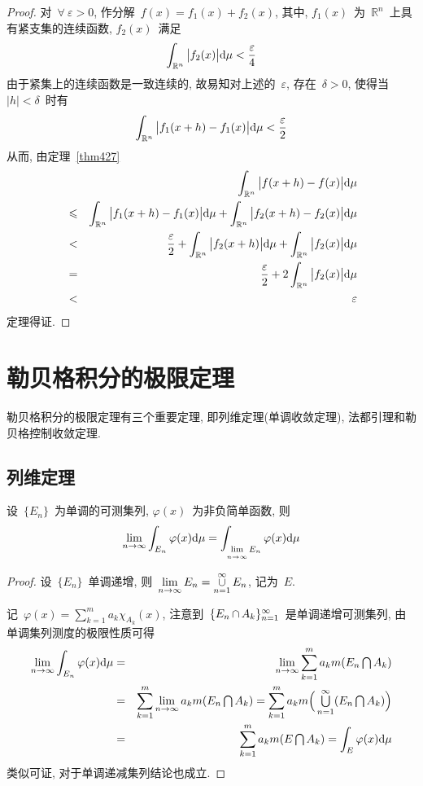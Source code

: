 \begin{proof}
对~$\forall~ \varepsilon > 0$, 作分解~$f(x) = f_1(x) + f_2(x)$, 其中, $f_1(x)$~为~$\mathbb{R}^n$~上具有紧支集的连续函数, $f_2(x)$~满足
\[
\int_{\mathbb{R}^n} \big|f_2(x)\big| \mathrm{d} \mu < \frac{\varepsilon}{4}
\]
由于紧集上的连续函数是一致连续的, 故易知对上述的~$\varepsilon$, 存在~$\delta > 0$, 使得当~$|h| < \delta$~时有
\[
\int_{\mathbb{R}^n} \big|f_1(x + h) - f_1(x) \big| \mathrm{d} \mu < \frac{\varepsilon}{2}
\]
从而, 由定理~\ref{thm427}
\begin{eqnarray*}
&& \int_{\mathbb{R}^n} \big| f(x + h) - f(x) \big| \mathrm{d} \mu \\
&\leqslant& \int_{\mathbb{R}^n} \big| f_1(x + h) - f_1(x) \big| \mathrm{d} \mu + \int_{\mathbb{R}^n} \big| f_2(x + h) - f_2(x) \big| \mathrm{d} \mu \\
&<& \frac{\varepsilon}{2} + \int_{\mathbb{R}^n} \big| f_2(x + h) \big| \mathrm{d} \mu + \int_{\mathbb{R}^n} \big| f_2(x) \big| \mathrm{d} \mu \\
&=& \frac{\varepsilon}{2} + 2 \int_{\mathbb{R}^n} \big| f_2(x) \big| \mathrm{d} \mu \\
&<& \varepsilon
\end{eqnarray*}
定理得证.
\end{proof}

\section{勒贝格积分的极限定理}

勒贝格积分的极限定理有三个重要定理, 即列维定理(单调收敛定理), 法都引理和勒贝格控制收敛定理.

\subsection{列维定理}

\begin{lemma} \label{lem431}
设~$\{E_n\}$~为单调的可测集列, $\varphi(x)$~为非负简单函数, 则
\[
\lim_{n \to \infty}  \int_{E_n} \varphi(x) \mathrm{d} \mu = \int_{\lim\limits_{n \to \infty} E_n} \varphi(x) \mathrm{d} \mu
\]
\end{lemma}

\begin{proof}
设~$\{E_n\}$~单调递增, 则~$\lim\limits_{n \to \infty} E_n = \mathop{\mathop{\cup}}\limits_{n=1}^\infty E_n$,  记为~$E$.

记~$\varphi(x) = \sum\limits_{k=1}^m a_k \chi_{A_k} (x)$, 注意到~$\{E_n \mathop{\cap} A_k\}_{n=1}^\infty$~是单调递增可测集列, 由单调集列测度的极限性质可得
\begin{eqnarray*}
\lim_{n \to \infty} \int_{E_n} \varphi(x) \mathrm{d} \mu &=& \lim_{n \to \infty} \sum_{k=1}^m a_k m(E_n \mathop{\textstyle{\bigcap}} A_k) \\
&=& \sum_{k=1}^m \lim_{n \to \infty} a_k m(E_n \mathop{\textstyle{\bigcap}} A_k) = \sum_{k=1}^m a_k m\Big(\mathop{\textstyle{\bigcup}}_{n=1}^\infty (E_n \mathop{\textstyle{\bigcap}} A_k)\Big) \\
&=& \sum_{k=1}^m a_k m(E \mathop{\textstyle{\bigcap}} A_k) = \int_E \varphi(x) \mathrm{d} \mu
\end{eqnarray*}
类似可证, 对于单调递减集列结论也成立.
\end{proof}

